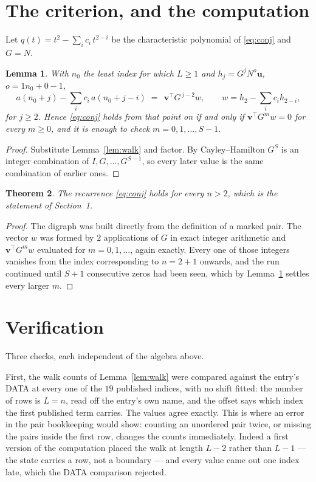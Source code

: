 \documentclass[11pt,a4paper]{article}
\theoremstyle{plain}
\newtheorem{theorem}{Theorem}
\newtheorem{lemma}[theorem]{Lemma}
\theoremstyle{definition}
\begin{document}
\section{The criterion, and the computation}

Let $q(t)=t^{2}-\sum_i c_i\,t^{2-i}$ be the characteristic polynomial of
\eqref{eq:conj} and $G=N$.

\begin{lemma}\label{lem:crit}
With $n_0$ the least index for which $L\ge1$ and $h_j=G^{j}N^{o}\mathbf{u}$,
$o=1n_0+0-1$,
\[
a(n_0+j)-\sum_i c_i\,a(n_0+j-i)\;=\;\,\mathbf{v}^{\!\top}G^{\,j-2}w,
\qquad w=h_{2}-\sum_i c_i h_{2-i},
\]
for $j\ge2$. Hence \eqref{eq:conj} holds from that point on if and only if
$\mathbf{v}^{\!\top}G^{m}w=0$ for every $m\ge0$, and it is enough to check
$m=0,1,\dots,S-1$.
\end{lemma}

\begin{proof}
Substitute Lemma~\ref{lem:walk} and factor. By Cayley--Hamilton $G^{S}$ is an integer
combination of $I,G,\dots,G^{S-1}$, so every later value is the same combination of earlier
ones.
\end{proof}

\begin{theorem}
The recurrence \eqref{eq:conj} holds for every $n>2$, which is the statement of
Section~1.
\end{theorem}

\begin{proof}
The digraph was built directly from the definition of a marked pair. The vector $w$ was
formed by $2$ applications of $G$ in exact integer arithmetic and
$\mathbf{v}^{\!\top}G^{m}w$ evaluated for $m=0,1,\dots$, again exactly. Every one of
those integers vanishes from the index corresponding to $n=2+1$ onwards, and the run
continued until $S+1$ consecutive zeros had been seen, which by Lemma~\ref{lem:crit}
settles every larger $m$.
\end{proof}

\section{Verification}

Three checks, each independent of the algebra above.

First, the walk counts of Lemma~\ref{lem:walk} were compared against the entry's DATA at
every one of the $19$ published indices, with no shift fitted: the number of rows is
$L=n$, read off the entry's own name, and the offset says which index the first
published term carries. The values agree exactly. This is where an error in the pair
bookkeeping would show: counting an unordered pair twice, or missing the pairs inside the
first row, changes the counts immediately. Indeed a first version of the computation
placed the walk at length $L-2$ rather than $L-1$ --- the state carries a row, not a
boundary --- and every value came out one index late, which the DATA comparison rejected.
\end{document}
